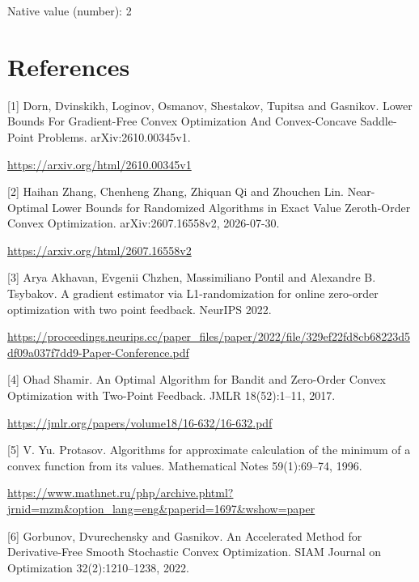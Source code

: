 \documentclass[10pt,a4paper]{article}
\begin{document}
Native value (number): 2



\section{References}


[1] Dorn, Dvinskikh, Loginov, Osmanov, Shestakov, Tupitsa and Gasnikov. Lower Bounds For Gradient-Free Convex Optimization And Convex-Concave Saddle-Point Problems. arXiv:2610.00345v1.



\url{https://arxiv.org/html/2610.00345v1}



[2] Haihan Zhang, Chenheng Zhang, Zhiquan Qi and Zhouchen Lin. Near-Optimal Lower Bounds for Randomized Algorithms in Exact Value Zeroth-Order Convex Optimization. arXiv:2607.16558v2, 2026-07-30.



\url{https://arxiv.org/html/2607.16558v2}



[3] Arya Akhavan, Evgenii Chzhen, Massimiliano Pontil and Alexandre B. Tsybakov. A gradient estimator via L1-randomization for online zero-order optimization with two point feedback. NeurIPS 2022.



\url{https://proceedings.neurips.cc/paper_files/paper/2022/file/329ef22fd8cb68223d5df09a037f7dd9-Paper-Conference.pdf}



[4] Ohad Shamir. An Optimal Algorithm for Bandit and Zero-Order Convex Optimization with Two-Point Feedback. JMLR 18(52):1--11, 2017.



\url{https://jmlr.org/papers/volume18/16-632/16-632.pdf}



[5] V. Yu. Protasov. Algorithms for approximate calculation of the minimum of a convex function from its values. Mathematical Notes 59(1):69--74, 1996.



\url{https://www.mathnet.ru/php/archive.phtml?jrnid=mzm&option_lang=eng&paperid=1697&wshow=paper}



[6] Gorbunov, Dvurechensky and Gasnikov. An Accelerated Method for Derivative-Free Smooth Stochastic Convex Optimization. SIAM Journal on Optimization 32(2):1210--1238, 2022.
\end{document}
